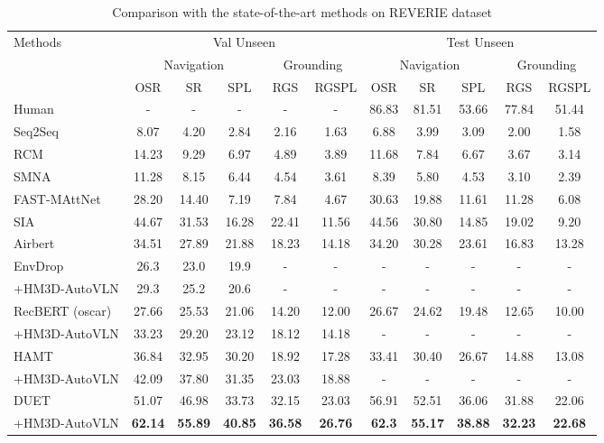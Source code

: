 \begin{table*}[t]
\scriptsize
\centering
\tabcolsep=0.09cm
\caption{Comparison with the state-of-the-art methods on REVERIE dataset}
\label{tab:reverie_sota_cmpr}
\begin{tabular}{l|ccccc|ccccc} \toprule
\multirow{3}{*}{Methods} & \multicolumn{5}{c|}{Val Unseen} & \multicolumn{5}{c}{Test Unseen} \\
& \multicolumn{3}{c}{Navigation} & \multicolumn{2}{c|}{Grounding} & \multicolumn{3}{c}{Navigation} & \multicolumn{2}{c}{Grounding}  \\ 
& OSR & SR & SPL & RGS & RGSPL & OSR & SR & SPL & RGS & RGSPL\\ \midrule
Human & - & - & - & - & - & 86.83 & 81.51 & 53.66 & 77.84 & 51.44 \\ \midrule
Seq2Seq \cite{anderson2018vision} & 8.07 & 4.20 & 2.84 & 2.16 & 1.63 & 6.88 & 3.99 & 3.09 & 2.00 & 1.58 \\
RCM \cite{wang2019reinforced} & 14.23 & 9.29 & 6.97 & 4.89 & 3.89 & 11.68 & 7.84 & 6.67 & 3.67 & 3.14 \\
SMNA \cite{ma2019self} & 11.28 & 8.15 & 6.44 & 4.54 & 3.61& 8.39 & 5.80 & 4.53 & 3.10 & 2.39 \\
\scriptsize{FAST-MAttNet} \cite{qi2020reverie} & 28.20 & 14.40 & 7.19 & 7.84 & 4.67 & 30.63 & 19.88 & 11.61 & 11.28 & 6.08 \\
SIA \cite{lin2021scene} & 44.67 & 31.53 & 16.28 & 22.41 & 11.56 & 44.56 & 30.80 & 14.85 & 19.02 & 9.20 \\
Airbert \cite{guhur2021airbert} & 34.51 & 27.89 & 21.88 & 18.23 & 14.18 & 34.20 & 30.28 & 23.61  & 16.83 & 13.28 \\ \midrule
EnvDrop~\cite{tan2019learning} &  26.3 & 23.0 & 19.9  & - & - & - & - & - & - & -\\
\quad \scriptsize{+HM3D-AutoVLN} &  29.3 & 25.2 & 20.6 & - & - & - & - & - & - & - \\ 
RecBERT (oscar) \cite{hong2020recurrent} & 27.66 & 25.53 & 21.06 & 14.20 & 12.00 & 26.67 & 24.62 & 19.48 & 12.65 & 10.00 \\ 
\quad \scriptsize{+HM3D-AutoVLN} & 33.23 & 29.20 & 23.12 & 18.12 & 14.18 & - & - & - & - & - \\ 
HAMT \cite{chen2021hamt} & 36.84 & 32.95 & 30.20 & 18.92 & 17.28 & 33.41 & 30.40 & 26.67 & 14.88 & 13.08 \\ 
\quad \scriptsize{+HM3D-AutoVLN}& 42.09 & 37.80 & 31.35 & 23.03 & 18.88 & - & - & - & - & - \\ 
DUET \cite{chen2022duet} & 51.07 & 46.98 & 33.73 & 32.15 & 23.03 & 56.91 & 52.51 & 36.06 & 31.88 & 22.06 \\  
\quad \scriptsize{+HM3D-AutoVLN} & \textbf{62.14} & \textbf{55.89} & \textbf{40.85} & \textbf{36.58} & \textbf{26.76} & \textbf{62.3} & \textbf{55.17} & \textbf{38.88} & \textbf{32.23} & \textbf{22.68} \\  \bottomrule

\end{tabular}
\end{table*}

